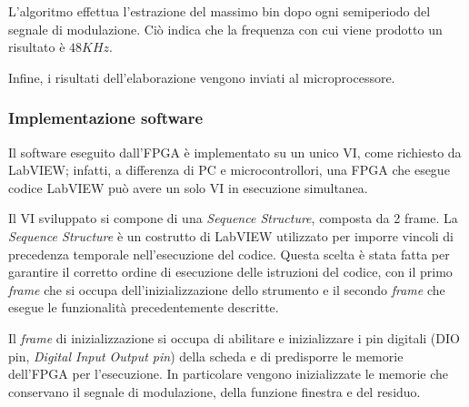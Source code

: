 L'algoritmo effettua l'estrazione del massimo bin dopo ogni semiperiodo del segnale di modulazione. Ciò indica che la frequenza con cui viene prodotto un risultato è $48KHz$.

Infine, i risultati dell'elaborazione vengono inviati al microprocessore.

\subsubsection{Implementazione software}
Il software eseguito dall'FPGA è implementato su un unico VI, come richiesto da LabVIEW; infatti, a differenza di PC e microcontrollori, una FPGA che esegue codice LabVIEW può avere un solo VI in esecuzione simultanea.

Il VI sviluppato si compone di una \textit{Sequence Structure}, composta da 2 frame. La \textit{Sequence Structure} è un costrutto di LabVIEW utilizzato per imporre vincoli di precedenza temporale nell'esecuzione del codice. Questa scelta è stata fatta per garantire il corretto ordine di esecuzione delle istruzioni del codice, con il primo \textit{frame} che si occupa dell'inizializzazione dello strumento e il secondo \textit{frame} che esegue le funzionalità precedentemente descritte.

Il \textit{frame} di inizializzazione si occupa di abilitare e inizializzare i pin digitali (DIO pin, \textit{Digital Input Output pin}) della scheda e di predisporre le memorie dell'FPGA per l'esecuzione. In particolare vengono inizializzate le memorie che conservano il segnale di modulazione, della funzione finestra e del residuo.

